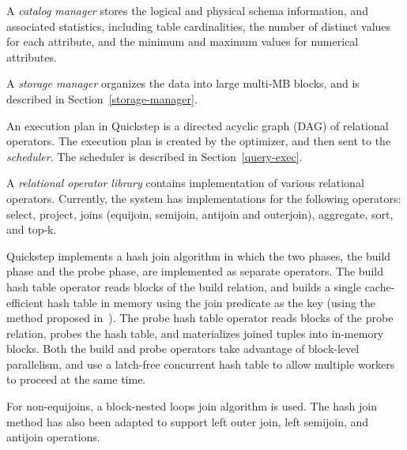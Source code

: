 A \textit{catalog manager} stores the logical and physical schema information, and associated statistics, including table cardinalities, the number of distinct values for each attribute, and the minimum and maximum values for numerical attributes. 

A \textit{storage manager} organizes the data into large multi-MB blocks, and is described in Section~\ref{storage-manager}. 

An execution plan in Quickstep is a directed acyclic graph (DAG) of relational operators. The execution plan is created by the optimizer, and then sent to the \textit{scheduler}. The scheduler is described in Section~\ref{query-exec}.

A \textit{relational operator library} contains 
implementation of various relational operators. Currently, the system has 
implementations for the following operators: select, project, joins (equijoin, semijoin, antijoin and outerjoin), aggregate, sort, and top-k. 

Quickstep implements a hash join algorithm in which the two phases, the build phase and the probe phase, are implemented as separate operators. The build hash table operator reads blocks of the build relation, and builds a single cache-efficient hash table in memory using the join predicate as the key (using the method proposed in~\cite{BlanasLP11}). The probe hash table operator reads blocks of the probe relation, probes the hash table, and materializes joined tuples into in-memory blocks. %
Both the build and probe operators take advantage of block-level parallelism, and use a latch-free concurrent hash table to allow multiple workers to proceed at the same time. 

For non-equijoins, a block-nested loops join 
algorithm is used.  %
The hash join method has also been adapted to support left outer join, left semijoin, and antijoin operations.

